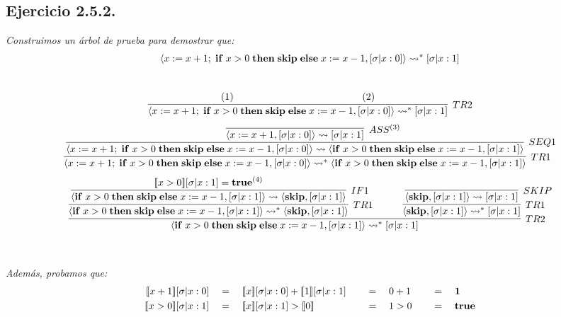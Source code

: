 \documentclass[a4paper,10pt]{article}
\begin{document}
\subsection*{Ejercicio 2.5.2.}
	\emph{Construimos un árbol de prueba para demostrar que:}
	\\
	\begin{align*}
		\langle x:= x+1;\;{\bf if}\; x>0\;{\bf then\;skip\;else}\; x:=x-1, [\sigma|x:0]\rangle \rightsquigarrow^*[\sigma|x:1]
	\end{align*}
	\\
	\begin{align*}
		\infer[TR2]{
			\langle x:= x+1;\;{\bf if}\; x>0\;{\bf then\;skip\;else}\; x:=x-1, [\sigma|x:0]\rangle \rightsquigarrow^*[\sigma|x:1]
		}{
			(1)\qquad \qquad \qquad & \qquad \qquad \qquad(2)
		}
	\end{align*}
	\begin{align}
		\infer[TR1]{
			\langle x:= x+1;\;{\bf if}\; x>0\;{\bf then\;skip\;else}\; x:=x-1, [\sigma|x:0]\rangle \rightsquigarrow^* \langle {\bf if}\; x>0\;{\bf then\;skip\;else}\; x:=x-1, [\sigma|x:1]\rangle
		}{
			\infer[SEQ1]{
				\langle x:= x+1;\;{\bf if}\; x>0\;{\bf then\;skip\;else}\; x:=x-1, [\sigma|x:0]\rangle \rightsquigarrow \langle {\bf if}\; x>0\;{\bf then\;skip\;else}\; x:=x-1, [\sigma|x:1]\rangle
			}{
				\infer[ASS^{(3)}]{
					\langle x:= x+1, [\sigma|x:0] \rangle \rightsquigarrow [\sigma|x:1]
				}{
				}
			}
		}
	\end{align}
	\begin{align}
		\infer[TR2]{
			\langle {\bf if}\; x>0\;{\bf then\;skip\;else}\; x:=x-1, [\sigma|x:1]\rangle \rightsquigarrow^* [\sigma|x:1]
		}{
			\infer[TR1]{
				\langle {\bf if}\; x>0\;{\bf then\;skip\;else}\; x:=x-1, [\sigma|x:1]\rangle \rightsquigarrow^* \langle {\bf skip}, [\sigma|x:1]\rangle
			}{
				\infer[IF1]{
					\langle {\bf if}\; x>0\;{\bf then\;skip\;else}\; x:=x-1, [\sigma|x:1]\rangle \rightsquigarrow \langle {\bf skip}, [\sigma|x:1]\rangle
				}{
					[\![x>0]\!][\sigma|x:1] = {\bf true}^{(4)}
				}
			} & \qquad
			\infer[TR1]{
				\langle {\bf skip}, [\sigma|x:1]\rangle \rightsquigarrow^* [\sigma|x:1]
			}{
				\infer[SKIP]{
					\langle {\bf skip}, [\sigma|x:1]\rangle \rightsquigarrow [\sigma|x:1]
				}{
				}
			}
		}
	\end{align}
	\\
	\\
	\emph{Además, probamos que:}
	\begin{alignat}{3}
		[\![x+1]\!][\sigma|x:0] \quad &= \quad [\![x]\!][\sigma|x:0] + [\![1]\!][\sigma|x:1] \quad &&= \quad 0+1 \quad &&= \quad {\bf 1}\\
	  	[\![x>0]\!][\sigma|x:1] \quad &= \quad [\![x]\!][\sigma|x:1] > [\![0]\!] \quad &&= \quad 1>0 \quad &&= \quad {\bf true}
	\end{alignat}
\\
\end{document}
